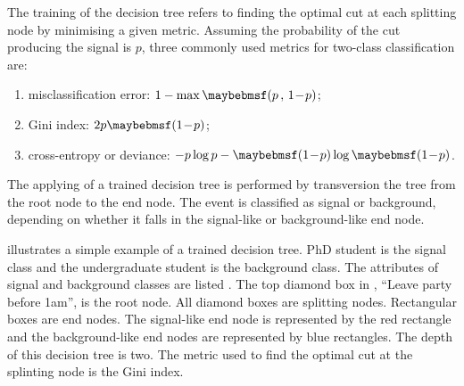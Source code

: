 

The training of the decision tree refers to finding the optimal cut at each splitting node by minimising a given metric. Assuming the probability of the cut producing the signal is $p$, three commonly used metrics for two-class classification are:
\begin{enumerate}
\item misclassification error:  $1 - \max\parenths{p\,,\,1\!-\!p}$;
\item Gini index: $2p\parenths{1\!-\!p}$;
\item cross-entropy or deviance: $-p\log{p}-\parenths{1\!-\!p}\log\parenths{1\!-\!p}$.
\end{enumerate}

The applying of a trained decision tree is performed by transversion the tree from the root node to the end node. The event is classified as signal or background, depending on whether it falls in the signal-like or background-like end node.



 illustrates a simple example of a trained decision tree. PhD student is the signal class and the undergraduate student is the background class. The attributes of signal and background classes are listed . The top diamond box in ,   ``Leave party  before  1am'', is the root node. All diamond boxes are splitting nodes. Rectangular boxes are end nodes.  The signal-like end node is represented by the red rectangle and the background-like end nodes are represented by blue rectangles. The depth of this decision tree is two. The metric used to find the optimal cut at the splinting node is the Gini index.

